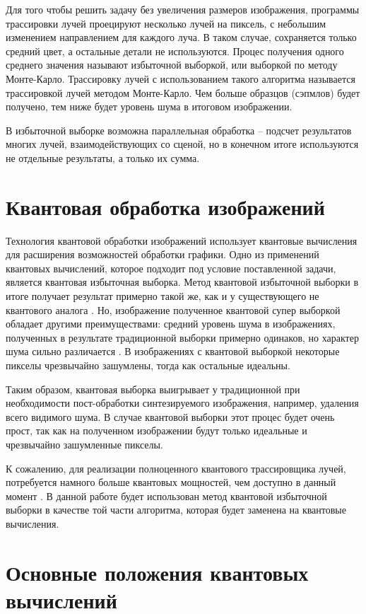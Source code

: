 Для того чтобы решить задачу без увеличения размеров изображения, программы трассировки лучей проецируют несколько лучей на пиксель, с небольшим изменением направлением для каждого луча. В таком случае, сохраняется только средний цвет, а остальные детали не используются. Процес получения одного среднего значения называют избыточной выборкой, или выборкой по методу Монте-Карло. Трассировку лучей с использованием такого алгоритма называется трассировкой лучей методом Монте-Карло. Чем больше образцов (сэпмлов) будет получено, тем ниже будет уровень шума в итоговом изображении. 

В избыточной выборке возможна параллельная обработка -- подсчет результатов многих лучей, взаимодействующих со сценой, но в конечном итоге используются не отдельные результаты, а только их сумма.

\section{Квантовая обработка изображений}

Технология квантовой обработки изображений использует квантовые вычисления для расширения возможностей обработки графики. Одно из применений квантовых вычислений, которое подходит под условие поставленной задачи, является квантовая избыточная выборка.
 Метод квантовой избыточной выборки в итоге получает результат примерно такой же, как и у существующего не квантового аналога \cite{PQC}. Но, изображение полученное квантовой супер выборкой обладает другими преимуществами: средний уровень шума в изображениях, полученных в результате традиционной выборки примерно одинаков, но характер шума сильно различается \cite{PQC}. В изображениях с квантовой выборкой некоторые пикселы чрезвычайно зашумлены, тогда как остальные идеальны. 
 
 Таким образом, квантовая выборка выигрывает у традиционной при необходимости пост-обработки синтезируемого изображения, например, удаления всего видимого шума. В случае квантовой выборки этот процес будет очень прост, так как на полученном изображении будут только идеальные и чрезвычайно зашумленные пикселы.

К сожалению, для реализации полноценного квантового трассировщика лучей, потребуется намного больше квантовых мощностей, чем доступно в данный момент \cite{PQC}. В данной работе будет использован метод квантовой избыточной выборки в качестве той части алгоритма, которая будет заменена на квантовые вычисления.

\section{Основные положения квантовых вычислений}

